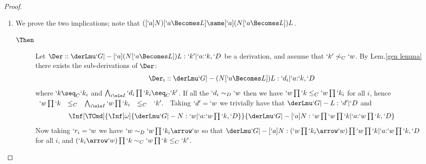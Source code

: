 \documentclass{CSML}
\begin{document}
\begin{proof}
\begin{enumerate}
\begin{description}
 \end{description}

 \item %
We prove the two implications; note that $([`a]N)[`a\Becomes L] \same [`a](N[`a\Becomes L])L$.

 \begin{description}
 \item [$\Then$] 
Let $\Der :: \derLmu `G |- {[`a](N[`a\Becomes L])L} : `k' | `a{:}`k,`D $ be a derivation, and assume that $`k' \not\sim_C `w$. By Lem.\skp\ref{gen lemma} there exists the sub-derivations of $\Der$:
 \[ \begin{array}{rcl@{\quad}l}
\Der_i:: \derLmu `G |- {(N[`a \Becomes L])L} : `d_i | `a{:}`k,`D 
 \end{array} \]
where $`k \seq_C `k_i$ and $\bigwedge_{i\ele I} `d_i\prod`k_i \seq_C `k'$.
If all the $`d_i \sim_D `w$ then we have
$`w\prod `k \leq_C `w\prod `k_i$ for all $i$, hence
 $ \begin{array}{ccccc}
`w\prod `k &\leq_C& \bigwedge_{i\ele I}`w\prod `k_i &\leq_C& `k'.
 \end{array} $
Taking $`d' = `w$ we trivially have that $\derLmu `G |- L: `d' | `D $ and
 \[ \begin{array}{c}
\Inf	[\TCmd]
	{\Inf	[\omega]
{\derLmu `G |- N : `w | `a{:}`w\prod `k,`D }
	}{\derLmu `G |- {[`a]N} : `w\prod `w\prod `k | `a{:}`w\prod `k,`D }
 \end{array}\]
Now taking $`r_i = `w$ we have $`w \sim_D `w\prod `k_i\arrow `w$ so that
$\derLmu `G |- {[`a]N}: (`w\prod `k_i\arrow `w)\prod `w\prod `k | `a{:}`w\prod `k,`D $ for all $i$, and
$(`k_i\arrow `w)\prod `k \sim_C `w\prod `k \leq_C `k'$.


\end{description}
\end{enumerate}
\end{proof}
\end{document}
